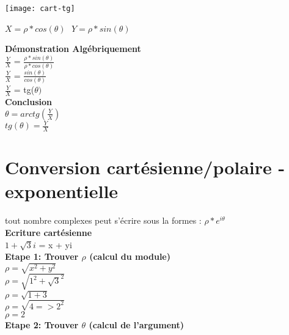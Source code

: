 \texttt{[image: cart-tg]}

$X=\rho * cos(\theta)$ $ $ $ Y=\rho * sin(\theta)$

\vspace{5mm} %
\textbf{Démonstration Algébriquement} \\

$\frac{Y}{X}$ = $\frac{\rho * sin(\theta)}{\rho * cos(\theta)}$ \\
$\frac{Y}{X}$ = $\frac{sin(\theta)}{cos(\theta)}$ \\
$\frac{Y}{X}$ = tg($\theta)$ \\

\vspace{5mm} %
\textbf{Conclusion} \\

$\theta = arctg(\frac{Y}{X})$ \\
$tg(\theta) = \frac{Y}{X}$ \\

\newpage
\section{Conversion cartésienne/polaire - exponentielle}
\vspace{3mm} %

tout nombre complexes peut s'écrire sous la formes : $\rho * e^{i\theta}$ \\

\textbf{Ecriture cartésienne} \\

$1+\sqrt{3}i$ = x + yi \\

\vspace{5mm}
\textbf{Etape 1: Trouver $\rho$ (calcul du module)} \\

$\rho = \sqrt{x^{2} + y^{2}}$ \\

$\rho = \sqrt{1^{2} + \sqrt{3}^{2}}$ \\

$\rho = \sqrt{1 + 3}$ \\

$\rho = \sqrt{4 => 2^{2}}$ \\

$\rho = 2$ \\

\vspace{5mm}
\textbf{Etape 2: Trouver $\theta$ (calcul de l'argument)} \\

